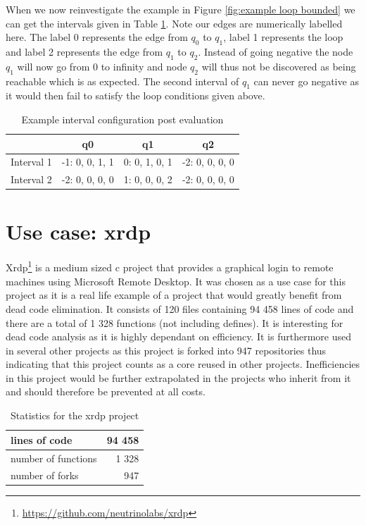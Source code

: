\documentclass[12pt]{article}
\begin{document}
When we now reinvestigate the example in Figure \ref{fig:example loop bounded} we can get the intervals given in Table \ref{table:example loop bounded intervals}. Note our edges are numerically labelled here. The label 0 represents the edge from $q_0$ to $q_1$, label 1 represents the loop and label 2 represents the edge from $q_1$ to $q_2$. Instead of going negative the node $q_1$ will now go from 0 to infinity and node $q_2$ will thus not be discovered as being reachable which is as expected. The second interval of $q_1$ can never go negative as it would then fail to satisfy the loop conditions given above.

\begin{table}[t]
	\centering
	\begin{tabular}{ |c|c|c|c|  }
		\hline
		& q0 				& q1 			& q2 \\
		\hline
		Interval 1 	& -1: 0, 0, 1, 1	& 0: 0, 1, 0, 1 & -2: 0, 0, 0, 0 \\
		\hline
		Interval 2 	& -2: 0, 0, 0, 0	& 1: 0, 0, 0, 2 & -2: 0, 0, 0, 0 \\
		\hline
	\end{tabular}
	\caption{Example interval configuration post evaluation}
	\label{table:example loop bounded intervals}
\end{table}

\section{Use case: xrdp}
Xrdp\footnote{\url{https://github.com/neutrinolabs/xrdp}} is a medium sized c project that provides a graphical login to remote machines using Microsoft Remote Desktop. It was chosen as a use case for this project as it is a real life example of a project that would greatly benefit from dead code elimination. It consists of 120 files containing 94 458 lines of code and there are a total of 1 328 functions (not including defines). It is interesting for dead code analysis as it is highly dependant on efficiency. It is furthermore used in several other projects as this project is forked into 947 repositories thus indicating that this project counts as a core reused in other projects. Inefficiencies in this project would be further extrapolated in the projects who inherit from it and should therefore be prevented at all costs.

\begin{table}[h]
	\centering
	\begin{tabular}{ |p{4.5cm}|r|  }
		\hline
		lines of code & 94 458\\
		\hline
		number of functions   & 1 328\\
		\hline
		number of forks   & 947\\
		\hline
	\end{tabular}
	\caption{Statistics for the xrdp project}
\end{table}
\end{document}
